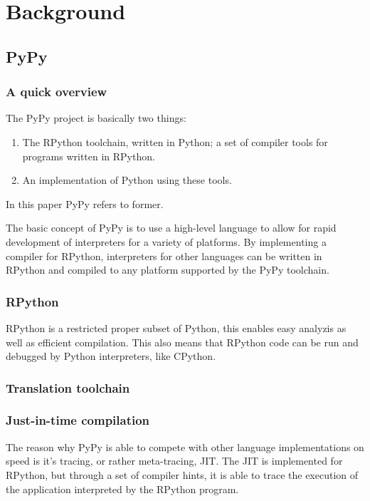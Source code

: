 
\section{Background}

\subsection{PyPy}

\subsubsection{A quick overview}

The PyPy project is basically two things:

\begin{enumerate}
\item The RPython toolchain, written in Python; a set of compiler tools for 
programs written in RPython.
\item An implementation of Python using these tools.
\end{enumerate}

In this paper PyPy refers to former.

The basic concept of PyPy is to use a high-level language to allow for rapid
development of interpreters for a variety of platforms. By implementing a compiler
for RPython, interpreters for other languages can be written in RPython and 
compiled to any platform supported by the PyPy toolchain. 

\subsubsection{RPython}

RPython is a restricted proper subset of Python, this enables easy analyzis 
as well as efficient compilation. This also means that RPython code can be
run and debugged by Python interpreters, like CPython.

\subsubsection{Translation toolchain}


\subsubsection{Just-in-time compilation}

The reason why PyPy is able to compete with other language implementations
on speed is it's tracing, or rather meta-tracing, JIT. The JIT is implemented
for RPython, but through a set of compiler hints, it is able to trace the 
execution of the application interpreted by the RPython program.

